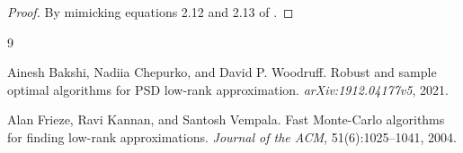 \documentclass{article}
\newcommand{\norm}[1]{\| #1 \|}
\newcommand{\bA}{\mathbf{A}}
\newcommand{\bB}{\mathbf{B}}
\newcommand{\bN}{\mathbf{N}}
\newcommand{\bX}{\mathbf{X}}
\theoremstyle{plain}
\theoremstyle{definition}
\begin{document}
\begin{proof}
By mimicking equations 2.12 and 2.13 of \cite{BCW21}.
\end{proof}





\begin{thebibliography}{9}

Ainesh Bakshi, Nadiia Chepurko, and David P. Woodruff.
\newblock Robust and sample optimal algorithms for PSD low-rank approximation.
\newblock \emph{arXiv:1912.04177v5}, 2021.

Alan Frieze, Ravi Kannan, and Santosh Vempala.
\newblock Fast Monte-Carlo algorithms for finding low-rank approximations.
\newblock \emph{Journal of the ACM}, 51(6):1025--1041, 2004.

\end{thebibliography}
\end{document}
